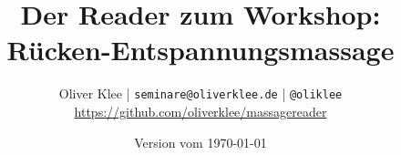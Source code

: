 \documentclass[a4paper,twoside,12pt,titlepage,headsepline]{scrartcl}
\author{Oliver Klee | \texttt{seminare@oliverklee.de} | \texttt{@oliklee}\\\url{https://github.com/oliverklee/massagereader}}
\title{Der Reader zum Workshop: Rücken-Entspannungsmassage}
\date{Version vom \today}
\begin{document}
\nocite*{}

\maketitle


\end{document}
